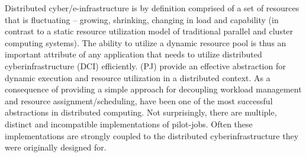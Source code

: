 \documentclass{sig-alternate}
\begin{document}
Distributed cyber/e-infrastructure is by definition comprised of a set
of resources that is fluctuating -- growing, shrinking, changing in
load and capability (in contrast to a static resource utilization
model of traditional parallel and cluster computing systems).  The
ability to utilize a dynamic resource pool is thus an important
attribute of any application that needs to utilize distributed
cyberinfrastructure (DCI) efficiently. \pilotjobs (PJ) provide an
effective abstraction for dynamic execution and resource utilization
in a distributed context. As a consequence of providing a simple
approach for decoupling workload management and resource
assignment/scheduling, \pilotjobs have been one of the most successful
abstractions in distributed computing.  Not surprisingly, there are
multiple, distinct and incompatible implementations of
pilot-jobs. Often these implementations are strongly coupled to the
distributed cyberinfrastructure they were originally designed for.


\end{document}
